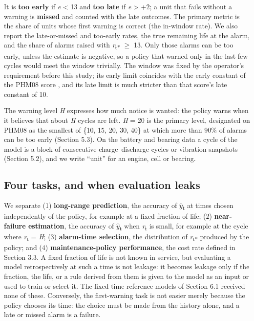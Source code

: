 \documentclass[a4paper,fleqn,doubleblind]{cas-dc}
\begin{document}
It is \textbf{too early} if \textit{e} < \textminus{}13 and \textbf{too late} if \textit{e} > +2; a unit that fails without a warning is \textbf{missed} and counted with the late outcomes. The primary metric is the share of units whose first warning is correct (the in-window rate). We also report the late-or-missed and too-early rates, the true remaining life at the alarm, and the share of alarms raised with \textit{r}\textsubscript{t*} $\ge$ 13. Only those alarms can be too early, unless the estimate is negative, so a policy that warned only in the last few cycles would meet the window trivially. The window was fixed by the operator's requirement before this study; its early limit coincides with the early constant of the PHM08 score \cite{saxena2008}, and its late limit is much stricter than that score's late constant of 10.

The warning level \textit{H} expresses how much notice is wanted: the policy warns when it believes that about \textit{H} cycles are left. \textit{H} = 20 is the primary level, designated on PHM08 as the smallest of \{10, 15, 20, 30, 40\} at which more than 90\% of alarms can be too early (Section 5.3). On the battery and bearing data a cycle of the model is a block of consecutive charge--discharge cycles or vibration snapshots (Section 5.2), and we write ``unit'' for an engine, cell or bearing.

\subsection{Four tasks, and when evaluation leaks}

We separate (1) \textbf{long-range prediction}, the accuracy of $\hat{y}$\textsubscript{t} at times chosen independently of the policy, for example at a fixed fraction of life; (2) \textbf{near-failure estimation}, the accuracy of $\hat{y}$\textsubscript{t} when \textit{r}\textsubscript{t} is small, for example at the cycle where \textit{r}\textsubscript{t} = \textit{H}; (3) \textbf{alarm-time selection}, the distribution of \textit{r}\textsubscript{t*} produced by the policy; and (4) \textbf{maintenance-policy performance}, the cost rate defined in Section 3.3. A fixed fraction of life is not known in service, but evaluating a model retrospectively at such a time is not leakage: it becomes leakage only if the fraction, the life, or a rule derived from them is given to the model as an input or used to train or select it. The fixed-time reference models of Section 6.1 received none of these. Conversely, the first-warning task is not easier merely because the policy chooses its time: the choice must be made from the history alone, and a late or missed alarm is a failure.
\end{document}
